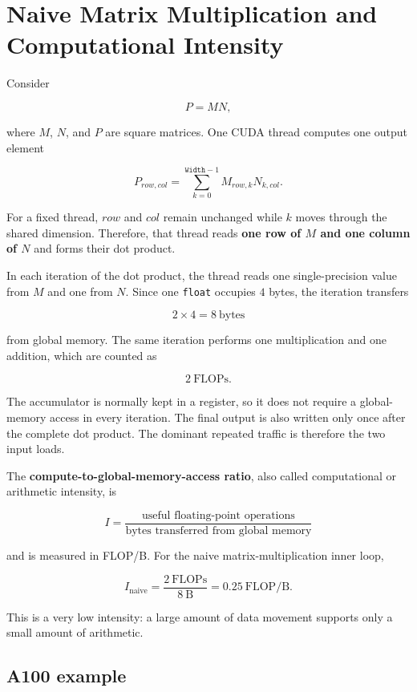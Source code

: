 \documentclass[11pt,a4paper]{article}
\begin{document}
\section{Naive Matrix Multiplication and Computational Intensity}

Consider

\[
    P = MN,
\]

where $M$, $N$, and $P$ are square matrices. One CUDA thread computes one output element

\[
    P_{row,col}
    =
    \sum_{k=0}^{\texttt{Width}-1}
    M_{row,k}N_{k,col}.
\]

For a fixed thread, $row$ and $col$ remain unchanged while $k$ moves through the shared dimension. Therefore, that thread reads \textbf{one row of $M$ and one column of $N$} and forms their dot product.

In each iteration of the dot product, the thread reads one single-precision value from $M$ and one from $N$. Since one \texttt{float} occupies $4$ bytes, the iteration transfers

\[
    2\times 4 = 8\ \text{bytes}
\]

from global memory. The same iteration performs one multiplication and one addition, which are counted as

\[
    2\ \text{FLOPs}.
\]

The accumulator is normally kept in a register, so it does not require a global-memory access in every iteration. The final output is also written only once after the complete dot product. The dominant repeated traffic is therefore the two input loads.

The \textbf{compute-to-global-memory-access ratio}, also called computational or arithmetic intensity, is

\[
\boxed{
    I
    =
    \frac{\text{useful floating-point operations}}
         {\text{bytes transferred from global memory}}
}
\]

and is measured in FLOP/B. For the naive matrix-multiplication inner loop,

\[
    I_{\text{naive}}
    =
    \frac{2\ \text{FLOPs}}{8\ \text{B}}
    =
    0.25\ \text{FLOP/B}.
\]

This is a very low intensity: a large amount of data movement supports only a small amount of arithmetic.

\subsection{A100 example}
\end{document}
